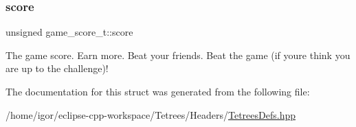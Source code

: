 \subsubsection{\texorpdfstring{score}{score}}
{\footnotesize\ttfamily unsigned game\+\_\+score\+\_\+t\+::score}

The game score. Earn more. Beat your friends. Beat the game (if you\textquotesingle{}re think you are up to the challenge)! 

The documentation for this struct was generated from the following file\+:\begin{DoxyCompactItemize}
\item 
/home/igor/eclipse-\/cpp-\/workspace/\+Tetrees/\+Headers/\hyperlink{TetreesDefs_8hpp}{Tetrees\+Defs.\+hpp}\end{DoxyCompactItemize}
